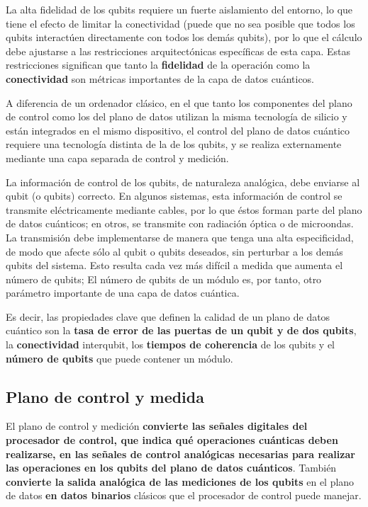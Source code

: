 La alta fidelidad de los qubits requiere un fuerte aislamiento del entorno, lo que tiene el efecto de limitar la conectividad (puede que no sea posible que todos los qubits interactúen directamente con todos los demás qubits), por lo que el cálculo debe ajustarse a las restricciones arquitectónicas específicas de esta capa. Estas restricciones significan que tanto la \textbf{fidelidad} de la operación como la \textbf{conectividad} son métricas importantes de la capa de datos cuánticos.	
	

A diferencia de un ordenador clásico, en el que tanto los componentes del plano de control como los del plano de datos utilizan la misma tecnología de silicio y están integrados en el mismo dispositivo, el control del plano de datos cuántico requiere una tecnología distinta de la de los qubits, y se realiza externamente mediante una capa separada de control y medición. 

La información de control de los qubits, de naturaleza analógica, debe enviarse al qubit (o qubits) correcto. En algunos sistemas, esta información de control se transmite eléctricamente mediante cables, por lo que éstos forman parte del plano de datos cuánticos; en otros, se transmite con radiación óptica o de microondas. La transmisión debe implementarse de manera que tenga una alta especificidad, de modo que afecte sólo al qubit o qubits deseados, sin perturbar a los demás qubits del sistema. Esto resulta cada vez más difícil a medida que aumenta el número de qubits; El número de qubits de un módulo es, por tanto, otro parámetro importante de una capa de datos cuántica.

Es decir, las propiedades clave que definen la calidad de un plano de datos cuántico son la \textbf{tasa de error de las puertas de un qubit y de dos qubits}, la \textbf{conectividad} interqubit, los \textbf{tiempos de coherencia} de los qubits y el \textbf{número de qubits} que puede contener un módulo.


	\subsection{Plano de control y medida}

El plano de control y medición \textbf{convierte las señales digitales del procesador de control, que indica qué operaciones cuánticas deben realizarse, en las señales de control analógicas necesarias para realizar las operaciones en los qubits del plano de datos cuánticos}. También \textbf{convierte la salida analógica de las mediciones de los qubits} en el plano de datos\textbf{ en datos binarios} clásicos que el procesador de control puede manejar. 

